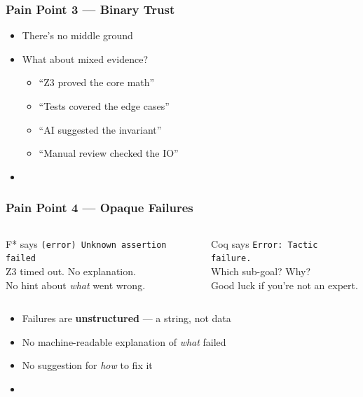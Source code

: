 \begin{frame}
\frametitle{Pain Point 3 --- Binary Trust}
\begin{center}
\end{center}
\vspace{0.3cm}
\begin{itemize}
  \item There's no middle ground
  \item What about mixed evidence?
  \begin{itemize}
    \item ``Z3 proved the core math''
    \item ``Tests covered the edge cases''
    \item ``AI suggested the invariant''
    \item ``Manual review checked the IO''
  \end{itemize}
  \item {}
\end{itemize}
\end{frame}

\begin{frame}
\frametitle{Pain Point 4 --- Opaque Failures}
\begin{columns}[T]
\begin{alertblock}{F* says}
  \texttt{(error) Unknown assertion failed}\\[4pt]
  \footnotesize Z3 timed out. No explanation.\\
  No hint about \emph{what} went wrong.
\end{alertblock}
\begin{alertblock}{Coq says}
  \texttt{Error: Tactic failure.}\\[4pt]
  \footnotesize Which sub-goal? Why?\\
  Good luck if you're not an expert.
\end{alertblock}
\end{columns}
\vfill
\begin{itemize}
  \item Failures are \textbf{unstructured} --- a string, not data
  \item No machine-readable explanation of \emph{what} failed
  \item No suggestion for \emph{how} to fix it
  \item {}
\end{itemize}
\end{frame}

